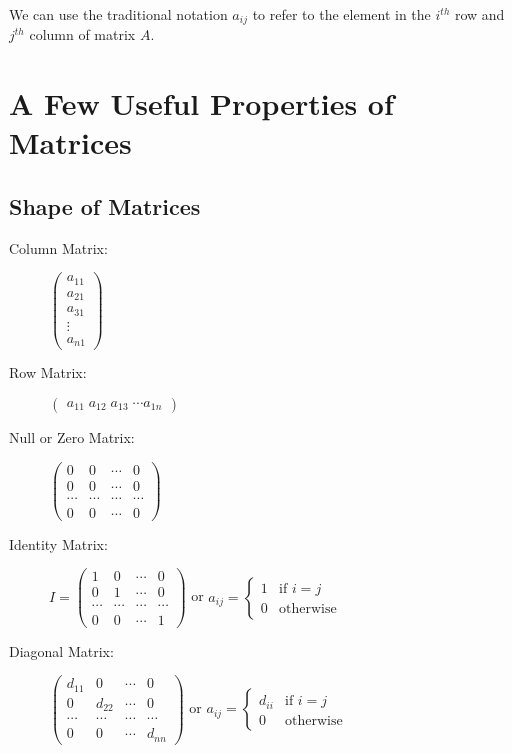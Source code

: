 \documentclass[12pts,a4paper,amsmath,amssymb,floatfix]{article}%
\begin{document}
We can use the traditional notation $a_{ij}$ to refer to the element in the $i^{th}$ row and $j^{th}$ column of matrix $A$.


\section{A Few Useful Properties of Matrices}

\subsection{Shape of Matrices}

\begin{description} 
%
\item[Column Matrix:] $\begin{pmatrix}a_{11}\\a_{21}\\a_{31}\\\vdots\\a_{n1}\end{pmatrix}$
%
\item[Row Matrix:] $\begin{pmatrix}a_{11}\; a_{12}\; a_{13}\; \cdots a_{1n}\end{pmatrix}$
%
\item[Null or Zero Matrix:] $\begin{pmatrix} 0 & 0 & \cdots & 0 \\ 0 & 0 & \cdots & 0 \\ \cdots & \cdots & \cdots & \cdots \\ 0 & 0 & \cdots & 0\end{pmatrix}$
%
\item[Identity Matrix:] $I = \begin{pmatrix} 1 & 0 & \cdots & 0 \\ 0 & 1 & \cdots & 0 \\ \cdots & \cdots & \cdots & \cdots \\ 0 & 0 & \cdots & 1\end{pmatrix}$ or $a_{ij}  = \begin{cases} 1 & \mbox{if } i=j \\0 & \mbox{otherwise} \end{cases}$ 
%
\item[Diagonal Matrix:] $\begin{pmatrix} d_{11} & 0 & \cdots & 0 \\ 0 & d_{22} & \cdots & 0 \\ \cdots & \cdots & \cdots & \cdots \\ 0 & 0 & \cdots & d_{nn}\end{pmatrix}$ or $a_{ij}  = \begin{cases} d_{ii} & \mbox{if } i=j \\0 & \mbox{otherwise} \end{cases}$

\end{description}
\end{document}
